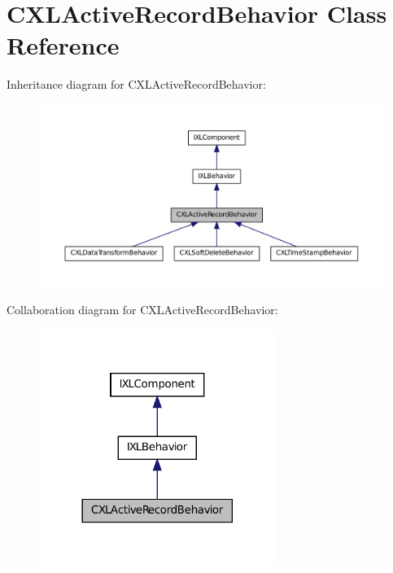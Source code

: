 \hypertarget{classCXLActiveRecordBehavior}{
\section{CXLActiveRecordBehavior Class Reference}
\label{classCXLActiveRecordBehavior}
}


Inheritance diagram for CXLActiveRecordBehavior:\nopagebreak
\begin{figure}[H]
\begin{center}
\leavevmode
\includegraphics[width=400pt]{classCXLActiveRecordBehavior__inherit__graph}
\end{center}
\end{figure}


Collaboration diagram for CXLActiveRecordBehavior:\nopagebreak
\begin{figure}[H]
\begin{center}
\leavevmode
\includegraphics[width=218pt]{classCXLActiveRecordBehavior__coll__graph}
\end{center}
\end{figure}
